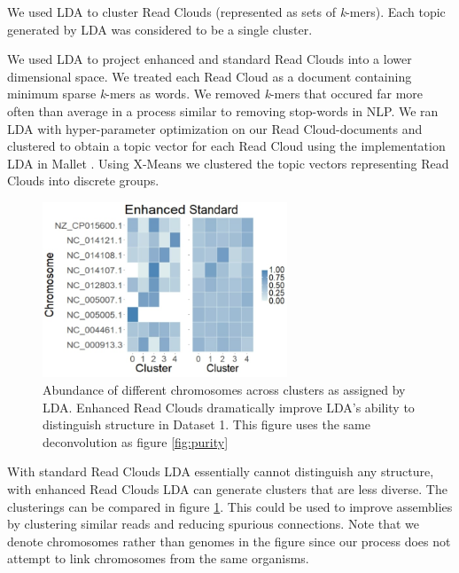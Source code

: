We used LDA to cluster Read Clouds (represented as sets of \textit{k}-mers). Each topic generated by LDA was considered to be a single cluster.

We used LDA to project enhanced and standard Read Clouds into a lower dimensional space. We treated each Read Cloud as a document containing minimum sparse \textit{k}-mers as words. We removed \textit{k}-mers that occured far more often than average in a process similar to removing stop-words in NLP. We ran LDA with hyper-parameter optimization on our Read Cloud-documents and clustered to obtain a topic vector for each Read Cloud using the implementation LDA in Mallet \citep{McCallum2002}. Using X-Means we clustered the topic vectors representing Read Clouds into discrete groups. 

\begin{figure}
  \vspace{-20pt}
  \begin{center}
    \includegraphics[width=0.65\textwidth]{figures/clusters.jpg}
	\vspace{5pt}
	\caption{\small{Abundance of different chromosomes across clusters as assigned by LDA. Enhanced Read Clouds dramatically improve LDA's ability to distinguish structure in Dataset 1. This figure uses the same deconvolution as figure \ref{fig:purity}}}
    \label{fig:q7}
  \end{center}
  \vspace{-10pt}
\end{figure}

With standard Read Clouds LDA essentially cannot distinguish any structure, with enhanced Read Clouds LDA can generate clusters that are less diverse. The clusterings can be compared in figure \ref{fig:q7}. This could be used to improve assemblies by clustering similar reads and reducing spurious connections. Note that we denote chromosomes rather than genomes in the figure since our process does not attempt to link chromosomes from the same organisms.

